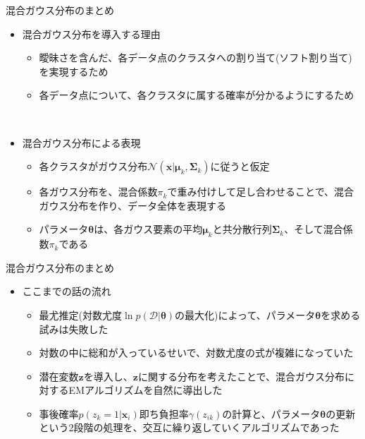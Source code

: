 \documentclass[dvipdfmx,notheorems,t]{beamer}
\begin{document}
\begin{frame}{混合ガウス分布のまとめ}

\begin{itemize}
	\item 混合ガウス分布を導入する理由
	\begin{itemize}
		\item 曖昧さを含んだ、各データ点のクラスタへの割り当て(\alert{ソフト割り当て})を実現するため
		\item 各データ点について、各クラスタに属する確率が分かるようにするため
	\end{itemize} \
	
	\item 混合ガウス分布による表現
	\begin{itemize}
		\item 各クラスタがガウス分布$\mathcal{N}(\bm{x} | \bm{\mu}_k, \bm{\Sigma}_k)$に従うと仮定
		\item 各ガウス分布を、混合係数$\pi_k$で重み付けして足し合わせることで、混合ガウス分布を作り、データ全体を表現する
		\item パラメータ$\bm{\theta}$は、各ガウス要素の平均$\bm{\mu}_k$と共分散行列$\bm{\Sigma}_k$、そして混合係数$\pi_k$である
	\end{itemize}
\end{itemize}

\end{frame}

\begin{frame}{混合ガウス分布のまとめ}

\begin{itemize}
	\item ここまでの話の流れ
	\begin{itemize}
		\item 最尤推定(対数尤度$\ln p(\mathcal{D} | \bm{\theta})$の最大化)によって、パラメータ$\bm{\theta}$を求める試みは失敗した
		\item \alert{対数の中に総和が入っている}せいで、対数尤度の式が複雑になっていた
		\newline
		\item \color{red}潜在変数$\bm{z}$\normalcolor を導入し、$\bm{z}$に関する分布を考えたことで、混合ガウス分布に対するEMアルゴリズムを自然に導出した
		\newline
		\item 事後確率$p(z_k = 1 | \bm{x}_i)$即ち負担率$\gamma(z_{ik})$の計算と、パラメータ$\bm{\theta}$の更新という\alert{2段階の処理}を、\alert{交互に繰り返していく}アルゴリズムであった
	\end{itemize}
\end{itemize}

\end{frame}
\end{document}
